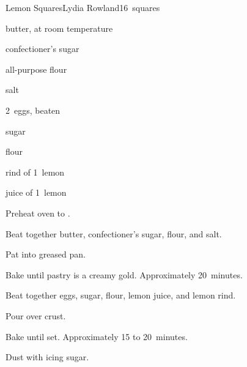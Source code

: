 \begin{recipe}{Lemon Squares}{Lydia Rowland}{16~squares}

\begin{ingredients}
\item \C{\half} butter, at room temperature
\item \C{\quarter} confectioner's sugar
\item {} all-purpose flour
\item \tp{\half} salt
\item 2~eggs, beaten
\item {} sugar
\item {} flour
\item rind of 1~lemon
\item juice of 1~lemon
\end{ingredients}

\begin{directions}
\item Preheat oven to .
\item Beat together butter, confectioner's sugar,  flour, and salt.
\item Pat into  greased pan.
\item Bake until pastry is a creamy gold. Approximately 20~minutes.
\item Beat together eggs, sugar,  flour, lemon juice, and lemon rind.
\item Pour over crust.
\item Bake until set. Approximately 15 to 20~minutes.
\item Dust with icing sugar.
\end{directions}

\end{recipe}
